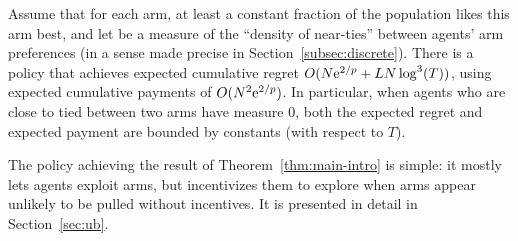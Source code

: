 



\begin{theorem} \label{thm:main-intro}
Assume that for each arm, at least a constant fraction \MinProb
of the population likes this arm best,
and let \TieDensity be a measure of the ``density of near-ties''
between agents' arm preferences
(in a sense made precise in Section~\ref{subsec:discrete}).
There is a policy that achieves expected 
cumulative regret $O (N \mathrm{e}^{2/p} + L N \log^3(T))$,
using expected cumulative payments of $O(N^2 \mathrm{e}^{2/p})$.
In particular, when agents who are close to tied between two arms have measure $0$,
both the expected regret and expected payment are bounded by constants
(with respect to $T$). 
\end{theorem}


The policy achieving the result of Theorem~\ref{thm:main-intro} is
simple: it mostly lets agents exploit arms, but incentivizes
them to explore when arms appear unlikely to be pulled without incentives.
It is presented in detail in Section~\ref{sec:ub}.
